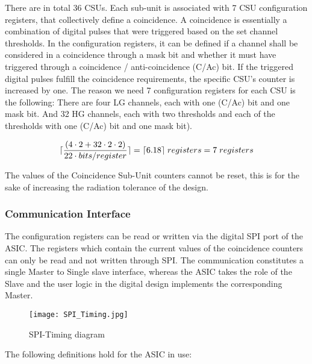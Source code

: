 There are in total 36 CSUs. Each sub-unit is associated with 7 CSU configuration registers, that collectively define a coincidence. A coincidence is essentially a combination of digital pulses that were triggered based on the set channel thresholds. In the configuration registers, it can be defined if a channel shall be considered in a coincidence through a mask bit and whether it must have triggered through a coincidence / anti-coincidence (C/Ac) bit. If the triggered digital pulses fulfill the coincidence requirements, the specific CSU’s counter is increased by one. The reason we need 7 configuration registers for each CSU is the following: 
\newline
There are four LG channels, each with one (C/Ac) bit and one mask bit. And 32 HG channels, each with two thresholds and each of the thresholds with one (C/Ac) bit and one mask bit).

\begin{equation}
\lceil{\frac{\left(4\cdot2 + 32 \cdot 2 \cdot 2 \right)}{22\cdot bits/register}}\rceil = \lceil{6.18}\rceil \hphantom{\cdot}  registers = 7 \hphantom{\cdot} registers
\end{equation}

The values of the Coincidence Sub-Unit counters cannot be reset, this is for the sake of increasing the radiation tolerance of the design.

\subsubsection{Communication Interface}

The configuration registers can be read or written via the digital SPI port of the ASIC. The registers which contain the current values of the coincidence counters can only be read and not written through SPI. The communication constitutes a single Master to Single slave interface, whereas the ASIC takes the role of the Slave and the user logic in the digital design implements the corresponding Master.

\begin{figure}[H]
    \centering
    \texttt{[image: SPI\_Timing.jpg]}
    \caption[]{SPI-Timing diagram }
    \label{fig:SPI_Timing}
\end{figure}

The following definitions hold for the ASIC in use:


